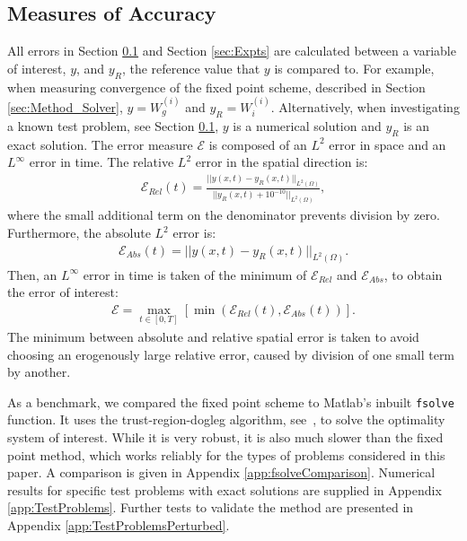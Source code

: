\subsection{Measures of Accuracy}\label{sec:Method_Validation}


All errors in Section \ref{sec:Method_Validation} and Section \ref{sec:Expts} are calculated between a variable of interest, $y$, and $y_R$, the reference value that $y$ is compared to. For example, when measuring convergence of the fixed point scheme, described in Section \ref{sec:Method_Solver}, $y = W^{(i)}_g$ and $y_R = W^{(i)}_i$. Alternatively, when investigating a known test problem, see Section \ref{sec:Method_Validation}, $y$ is a numerical solution and $y_R$ is an exact solution. The error measure $\mathcal{E}$ is composed of an $L^2$ error in space and an $L^\infty$ error in time. The relative $L^2$ error in the spatial direction is:
\begin{align*}
\mathcal{E}_{Rel}(t) = \frac{|| y(x,t) - y_{R}(x,t)||_{L^2(\Omega)} }{||y_R(x,t) + 10^{-10}||_{L^2(\Omega)}},
\end{align*}
where the small additional term on the denominator prevents division by zero.
Furthermore, the absolute $L^2$ error is:
\begin{align*}
\mathcal{E}_{Abs}(t) = || y(x,t) - y_R(x,t)||_{L^2(\Omega)}.
\end{align*}
Then, an $L^\infty$ error in time is taken of the minimum of $\mathcal{E}_{Rel}$ and $\mathcal{E}_{Abs}$, to obtain the error of interest:
\begin{align*}
\mathcal{E} = \max_{t \in [0,T]}\left[\min\left(\mathcal{E}_{Rel}(t), \mathcal{E}_{Abs}(t)\right)\right].
\end{align*}
The minimum between absolute and relative spatial error is taken to avoid choosing an erogenously large relative error, caused by division of one small term by another.

As a benchmark, we compared the fixed point scheme to Matlab's inbuilt \texttt{fsolve} function. It uses the trust-region-dogleg algorithm, see~\cite{Powell1}, to solve the optimality system of interest. While it is very robust, it is also much slower than the fixed point method, which works reliably for the types of problems considered in this paper. A comparison is given in Appendix \ref{app:fsolveComparison}. Numerical results for specific test problems with exact solutions are supplied in Appendix \ref{app:TestProblems}. Further tests to validate the method are presented in Appendix \ref{app:TestProblemsPerturbed}.
